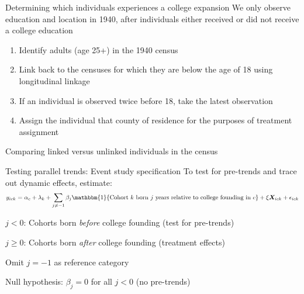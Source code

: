 \documentclass[notes,11pt, aspectratio=169]{beamer}
\newenvironment{wideitemize}{\itemize\addtolength{\itemsep}{10pt}}{\enditemize}
\begin{document}
\begin{frame}{Determining which individuals experiences a college expansion}
  We only observe education and location in 1940, after individuals either received or did not receive a college education \vspace{.4cm}
  \begin{enumerate}
    \item Identify adults (age 25+) in the 1940 census
    \item Link back to the censuses for which they are below the age of 18 using \cite{rugglesIPUMSUSAVersion2025} longitudinal linkage
    \item If an individual is observed twice before 18, take the latest observation
    \item Assign the individual that county of residence for the purposes of treatment assignment 
  \end{enumerate}
\end{frame}

\begin{frame}{Comparing linked versus unlinked individuals in the census}
  
\end{frame}


\begin{frame}{Testing parallel trends: Event study specification}
  To test for pre-trends and trace out dynamic effects, estimate:
  \begin{equation}
    y_{ick} = \alpha_c + \lambda_k + \sum_{j \neq -1} \beta_j \mathbbm{1}\{\text{Cohort } k \text{ born } j \text{ years relative to college founding in } c\} + \xi \bm{X}_{ick} + \epsilon_{ick}
  \end{equation}
  \begin{wideitemize}
    \item $j < 0$: Cohorts born \textit{before} college founding (test for pre-trends)
    \item $j \geq 0$: Cohorts born \textit{after} college founding (treatment effects)
    \item Omit $j = -1$ as reference category
    \item Null hypothesis: $\beta_j = 0$ for all $j < 0$ (no pre-trends)
  \end{wideitemize}
\end{frame}

\appendix
{}
\end{document}
